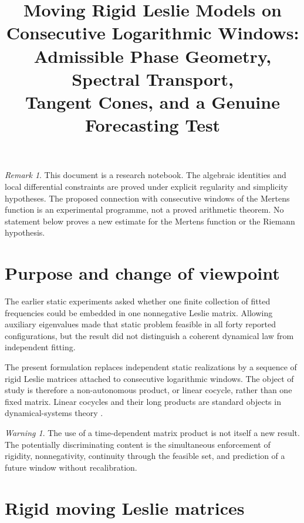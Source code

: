 \documentclass[11pt]{amsart}
\title{Moving Rigid Leslie Models on Consecutive Logarithmic Windows:\\Admissible Phase Geometry, Spectral Transport,\\Tangent Cones, and a Genuine Forecasting Test}
\author{}
\date{}
\numberwithin{equation}{section}
\theoremstyle{plain}
\theoremstyle{definition}
\theoremstyle{remark}
\newtheorem{remark}[theorem]{Remark}
\newtheorem{warning}[theorem]{Warning}
\begin{document}
\maketitle
\tableofcontents
\bigskip

\begin{remark}
\label{rem:status}
This document is a research notebook.  The algebraic identities and local differential constraints are proved under explicit regularity and simplicity hypotheses.  The proposed connection with consecutive windows of the Mertens function is an experimental programme, not a proved arithmetic theorem.  No statement below proves a new estimate for the Mertens function or the Riemann hypothesis.
\end{remark}

\section{Purpose and change of viewpoint}
\label{sec:purpose}

The earlier static experiments asked whether one finite collection of fitted frequencies could be embedded in one nonnegative Leslie matrix.  Allowing auxiliary eigenvalues made that static problem feasible in all forty reported configurations, but the result did not distinguish a coherent dynamical law from independent fitting.

The present formulation replaces independent static realizations by a sequence of rigid Leslie matrices attached to consecutive logarithmic windows.  The object of study is therefore a non-autonomous product, or linear cocycle, rather than one fixed matrix.  Linear cocycles and their long products are standard objects in dynamical-systems theory \cite{DuarteKlein2016}.

\begin{warning}
\label{warn:no_automatic_novelty}
The use of a time-dependent matrix product is not itself a new result.  The potentially discriminating content is the simultaneous enforcement of rigidity, nonnegativity, continuity through the feasible set, and prediction of a future window without recalibration.
\end{warning}

\section{Rigid moving Leslie matrices}
\label{sec:rigid_moving_leslie}
\end{document}
